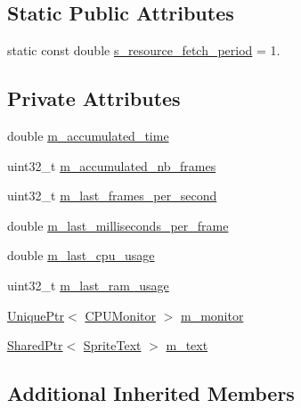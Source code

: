 \subsection*{Static Public Attributes}
\begin{DoxyCompactItemize}
\item 
static const double \hyperlink{classmage_1_1_stats_script_a3601b2c67bfa911d98187857b05c17ab}{s\+\_\+resource\+\_\+fetch\+\_\+period} = 1.
\end{DoxyCompactItemize}
\subsection*{Private Attributes}
\begin{DoxyCompactItemize}
\item 
double \hyperlink{classmage_1_1_stats_script_a55cb25f27b2354983d4e68cb1d4c8fcf}{m\+\_\+accumulated\+\_\+time}
\item 
uint32\+\_\+t \hyperlink{classmage_1_1_stats_script_ac12aaf08707f8de8d88391bcc7f81c53}{m\+\_\+accumulated\+\_\+nb\+\_\+frames}
\item 
uint32\+\_\+t \hyperlink{classmage_1_1_stats_script_afcbbf37839891d06b1331af3cc7f6e82}{m\+\_\+last\+\_\+frames\+\_\+per\+\_\+second}
\item 
double \hyperlink{classmage_1_1_stats_script_a0f8b9956d7f366246c925003c0afb278}{m\+\_\+last\+\_\+milliseconds\+\_\+per\+\_\+frame}
\item 
double \hyperlink{classmage_1_1_stats_script_ae7dd506d04a4512ae103a1a9c2f9f206}{m\+\_\+last\+\_\+cpu\+\_\+usage}
\item 
uint32\+\_\+t \hyperlink{classmage_1_1_stats_script_a92335c973382a332cf5ce328454fd07b}{m\+\_\+last\+\_\+ram\+\_\+usage}
\item 
\hyperlink{namespacemage_a3316d7143a973e37adf1110f2e80ca31}{Unique\+Ptr}$<$ \hyperlink{classmage_1_1_c_p_u_monitor}{C\+P\+U\+Monitor} $>$ \hyperlink{classmage_1_1_stats_script_a12e321d8fe1003de3643c4b799dd4c8f}{m\+\_\+monitor}
\item 
\hyperlink{namespacemage_a1e01ae66713838a7a67d30e44c67703e}{Shared\+Ptr}$<$ \hyperlink{classmage_1_1_sprite_text}{Sprite\+Text} $>$ \hyperlink{classmage_1_1_stats_script_a35bb45baabf290be684c8b67f30feeb7}{m\+\_\+text}
\end{DoxyCompactItemize}
\subsection*{Additional Inherited Members}


